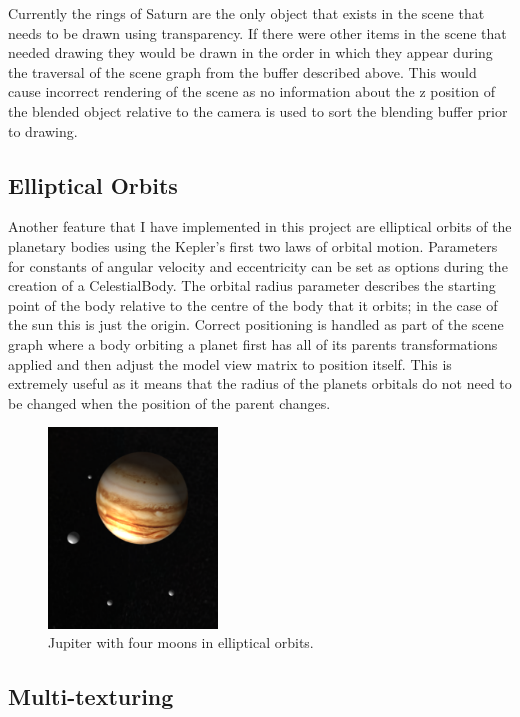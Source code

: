 \documentclass[paper=a4, fontsize=11pt]{scrartcl}	%
\numberwithin{equation}{section}															%
\numberwithin{figure}{section}																%
\numberwithin{table}{section}																%
\begin{document}
Currently the rings of Saturn are the only object that exists in the scene that needs to be drawn using transparency. If there were other items in the scene that needed drawing they would be drawn in the order in which they appear during the traversal of the scene graph from the buffer described above. This would cause incorrect rendering of the scene as no information about the z position of the blended object relative to the camera is used to sort the blending buffer prior to drawing.

\subsection{Elliptical Orbits}
Another feature that I have implemented in this project are elliptical orbits of the planetary bodies using the Kepler's first two laws of orbital motion. Parameters for constants of angular velocity and eccentricity can be set as options during the creation of a CelestialBody. The orbital radius parameter describes the starting point of the body relative to the centre of the body that it orbits; in the case of the sun this is just the origin. Correct positioning is handled as part of the scene graph where a body orbiting a planet first has all of its parents transformations applied and then adjust the model view matrix to position itself. This is extremely useful as it means that the radius of the planets orbitals do not need to be changed when the position of the parent changes.

\begin{figure}[H]
\centering
\includegraphics[width=0.4\textwidth]{img/jupiter_moons.png}
\caption{Jupiter with four moons in elliptical orbits.}
\label{fig:jupiter-moons-elliptical}
\end{figure}

\subsection{Multi-texturing}
\end{document}
